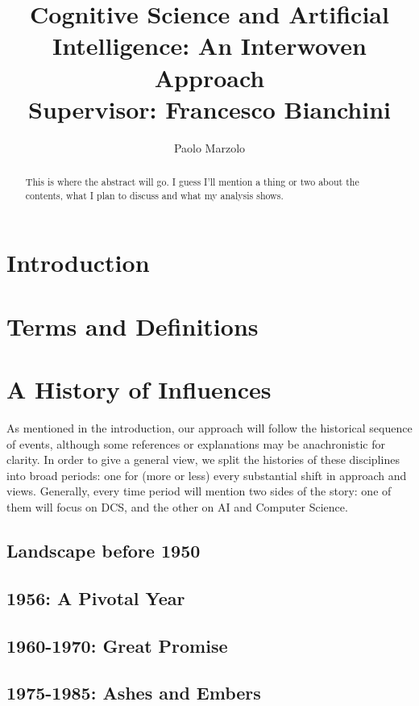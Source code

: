 \documentclass{article}
\title{Cognitive Science and Artificial Intelligence: An Interwoven Approach \\
\large Supervisor: Francesco Bianchini}
\author{Paolo Marzolo}
\begin{document}
\begin{abstract}
    This is where the abstract will go. I guess I'll mention a thing or two about the contents, what I plan to discuss and what my analysis shows.
\end{abstract}

\maketitle
\newpage

\section{Introduction}


\section{Terms and Definitions}


\section{A History of Influences}
As mentioned in the introduction, our approach will follow the historical sequence of events, although some references or explanations may be anachronistic for clarity. In order to give a general view, we split the histories of these disciplines into broad periods: one for (more or less) every substantial shift in approach and views. Generally, every time period will mention two sides of the story: one of them will focus on DCS, and the other on AI and Computer Science.

\subsection{Landscape before 1950}


\subsection{1956: A Pivotal Year}


\subsection{1960-1970: Great Promise}


\subsection{1975-1985: Ashes and Embers}

\end{document}
